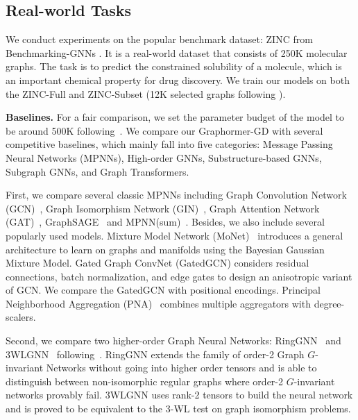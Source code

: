 \documentclass{article} %
\begin{document}
\subsection{Real-world Tasks}
\label{sec:realworld_detail}

We conduct experiments on the popular benchmark dataset: ZINC from Benchmarking-GNNs \citep{dwivedi2020benchmarking}. It is a real-world dataset that consists of 250K molecular graphs. The task is to predict the constrained solubility of a molecule, which is an important chemical property for drug discovery. We train our models on both the ZINC-Full and ZINC-Subset (12K selected graphs following \citet{dwivedi2020benchmarking}).

\textbf{Baselines.} For a fair comparison, we set the parameter budget of the model to be around 500K following~\cite{dwivedi2020benchmarking}. We compare our Graphormer-GD with several competitive baselines, which mainly fall into five categories: Message Passing Neural Networks (MPNNs), High-order GNNs, Substructure-based GNNs, Subgraph GNNs, and Graph Transformers.

First, we compare several classic MPNNs including Graph Convolution Network (GCN)~\citep{kipf2017semisupervised}, Graph Isomorphism Network (GIN)~\citep{xu2019powerful}, Graph Attention Network (GAT)~\citep{velivckovic2018graph}, GraphSAGE~\citep{hamilton2017inductive} and MPNN(sum)~\citep{gilmer2017neural}. Besides, we also include several popularly used models. Mixture Model Network (MoNet)~\citep{monti2017geometric} introduces a general architecture to
learn on graphs and manifolds using the Bayesian Gaussian Mixture Model. Gated Graph ConvNet (GatedGCN) considers residual connections, batch normalization, and edge gates to design an anisotropic variant of GCN. We compare the GatedGCN with positional encodings. Principal Neighborhood Aggregation (PNA)~\citep{corso2020principal} combines multiple aggregators with degree-scalers.


Second, we compare two higher-order Graph Neural Networks: RingGNN~\citep{chen2019equivalence} and 3WLGNN~\citep{maron2019provably} following~\citet{dwivedi2020benchmarking}. RingGNN extends the family of order-2 Graph $G$-invariant Networks without going into higher order tensors and is able to distinguish between non-isomorphic regular graphs where order-2 $G$-invariant networks provably fail. 3WLGNN uses rank-2 tensors to build the neural network and is proved to be equivalent to the 3-WL test on graph isomorphism problems. 
\end{document}
